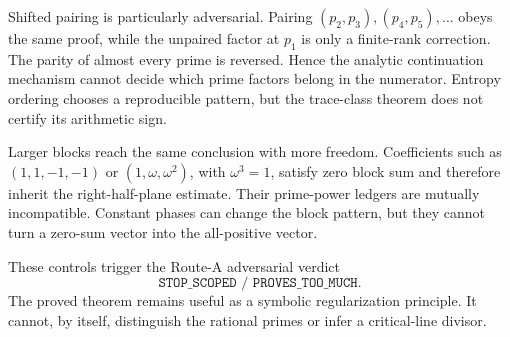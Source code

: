 Shifted pairing is particularly adversarial.  Pairing
$(p_2,p_3),(p_4,p_5),\ldots$ obeys the same proof, while the unpaired factor
at $p_1$ is only a finite-rank correction.  The parity of almost every prime
is reversed.  Hence the analytic continuation mechanism cannot decide which
prime factors belong in the numerator.  Entropy ordering chooses a reproducible
pattern, but the trace-class theorem does not certify its arithmetic sign.

Larger blocks reach the same conclusion with more freedom.  Coefficients such
as $(1,1,-1,-1)$ or $(1,\omega,\omega^2)$, with $\omega^3=1$, satisfy zero
block sum and therefore inherit the right-half-plane estimate.  Their
prime-power ledgers are mutually incompatible.  Constant phases can change
the block pattern, but they cannot turn a zero-sum vector into the all-positive
vector.

These controls trigger the Route-A adversarial verdict
\[
 \boxed{\texttt{STOP\_SCOPED / PROVES\_TOO\_MUCH}}.               \tag{7.3}
\]
The proved theorem remains useful as a symbolic regularization principle.  It
cannot, by itself, distinguish the rational primes or infer a critical-line
divisor.
